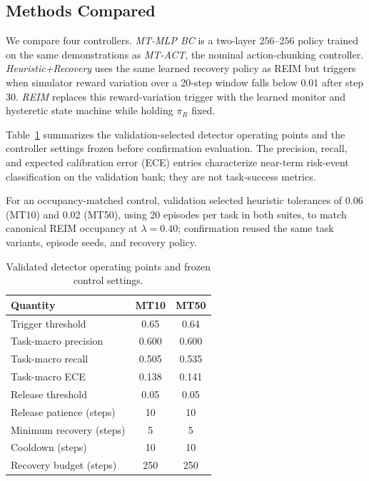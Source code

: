\documentclass[conference]{IEEEtran}
\newcommand{\noise}{\lambda}
\begin{document}
\subsection{Methods Compared}
We compare four controllers. \emph{MT-MLP BC} is a two-layer $256$--$256$ policy trained on the same demonstrations as \emph{MT-ACT}, the nominal action-chunking controller. \emph{Heuristic+Recovery} uses the same learned recovery policy as REIM but triggers when simulator reward variation over a 20-step window falls below 0.01 after step 30. \emph{REIM} replaces this reward-variation trigger with the learned monitor and hysteretic state machine while holding $\pi_R$ fixed.

Table~\ref{tab:gate} summarizes the validation-selected detector operating points and the controller settings frozen before confirmation evaluation. The precision, recall, and expected calibration error (ECE) entries characterize near-term risk-event classification on the validation bank; they are not task-success metrics.

For an occupancy-matched control, validation selected heuristic tolerances of 0.06 (MT10) and 0.02 (MT50), using 20 episodes per task in both suites, to match canonical REIM occupancy at $\noise=0.40$; confirmation reused the same task variants, episode seeds, and recovery policy.

\begin{table}[t]
\centering
\caption{Validated detector operating points and frozen control settings.}
\label{tab:gate}
\footnotesize
\setlength{\tabcolsep}{3.0pt}
\begin{tabular}{lcc}
\toprule
Quantity & MT10 & MT50 \\
\midrule
Trigger threshold & 0.65 & 0.64 \\
Task-macro precision & 0.600 & 0.600 \\
Task-macro recall & 0.505 & 0.535 \\
Task-macro ECE & 0.138 & 0.141 \\
\midrule
Release threshold & 0.05 & 0.05 \\
Release patience (steps) & 10 & 10 \\
Minimum recovery (steps) & 5 & 5 \\
Cooldown (steps) & 10 & 10 \\
Recovery budget (steps) & 250 & 250 \\
\bottomrule
\end{tabular}
\end{table}
\end{document}
